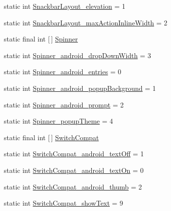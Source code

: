 \begin{DoxyCompactItemize}
\item 
static int \hyperlink{classandroid_1_1support_1_1v7_1_1cardview_1_1R_1_1styleable_a964a1df1d1968a300ceb9add6dd8ee9a}{Snackbar\+Layout\+\_\+elevation} = 1
\item 
static int \hyperlink{classandroid_1_1support_1_1v7_1_1cardview_1_1R_1_1styleable_a9640f431c4f2b457dc8b393e43e89ba9}{Snackbar\+Layout\+\_\+max\+Action\+Inline\+Width} = 2
\item 
static final int \mbox{[}$\,$\mbox{]} \hyperlink{classandroid_1_1support_1_1v7_1_1cardview_1_1R_1_1styleable_a84bb9d44bbc6f8ef3357f2510af054d5}{Spinner}
\item 
static int \hyperlink{classandroid_1_1support_1_1v7_1_1cardview_1_1R_1_1styleable_af98af2c6d2e0644eec83ef48d02be102}{Spinner\+\_\+android\+\_\+drop\+Down\+Width} = 3
\item 
static int \hyperlink{classandroid_1_1support_1_1v7_1_1cardview_1_1R_1_1styleable_acdfba553940dcc6367b563bb8c3b9672}{Spinner\+\_\+android\+\_\+entries} = 0
\item 
static int \hyperlink{classandroid_1_1support_1_1v7_1_1cardview_1_1R_1_1styleable_a4f0b0a21325a8ab495843ba149f8b532}{Spinner\+\_\+android\+\_\+popup\+Background} = 1
\item 
static int \hyperlink{classandroid_1_1support_1_1v7_1_1cardview_1_1R_1_1styleable_ae19e4b2683fbfaad925e3b99991c6887}{Spinner\+\_\+android\+\_\+prompt} = 2
\item 
static int \hyperlink{classandroid_1_1support_1_1v7_1_1cardview_1_1R_1_1styleable_ad9a6671f55c713c647bb4e3c5f60946f}{Spinner\+\_\+popup\+Theme} = 4
\item 
static final int \mbox{[}$\,$\mbox{]} \hyperlink{classandroid_1_1support_1_1v7_1_1cardview_1_1R_1_1styleable_a8b1fbe9bb91473a7977ff98951ed5255}{Switch\+Compat}
\item 
static int \hyperlink{classandroid_1_1support_1_1v7_1_1cardview_1_1R_1_1styleable_a1bc9b7fb068e2c5acdee2d1f23283c6e}{Switch\+Compat\+\_\+android\+\_\+text\+Off} = 1
\item 
static int \hyperlink{classandroid_1_1support_1_1v7_1_1cardview_1_1R_1_1styleable_a0aca0706e8d4b21ec30c7df58ce31033}{Switch\+Compat\+\_\+android\+\_\+text\+On} = 0
\item 
static int \hyperlink{classandroid_1_1support_1_1v7_1_1cardview_1_1R_1_1styleable_a3a27aac17c76def284b1d0b7610ccc61}{Switch\+Compat\+\_\+android\+\_\+thumb} = 2
\item 
static int \hyperlink{classandroid_1_1support_1_1v7_1_1cardview_1_1R_1_1styleable_ad2a7ec0499f9c6b3a7bfda457a82be97}{Switch\+Compat\+\_\+show\+Text} = 9

\end{DoxyCompactItemize}
